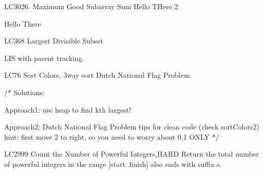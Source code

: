 \begin{problem}{LC3026. Maximum Good Subarray Sum}
    Hello THere 2
\end{problem}

\begin{solution}

    \begin{code3}
        Hello There
    \end{code3}
\end{solution}

\begin{problem}{LC368 Largest Divisible Subset}
\end{problem}

\begin{solution}[Pure LIS (=ending at idx)]

    LIS with parent tracking.
\end{solution}

\begin{problem}{LC76 Sort Colors, 3way sort}
    Dutch National Flag Problem
\end{problem}

\begin{solution}[hints]
    \begin{code2}
    /* Solutions:

    Approach1: use heap to find kth largest!

    Approach2: Dutch National Flag Problem
        tips for clean code (check sortColors2)
        hint: first move 2 to right, so you need to worry about 0,1 ONLY
    */
    \end{code2}
\end{solution}


\begin{problem}{LC2999 Count the Number of Powerful Integers,HARD}
    Return the total number of powerful integers in the range [start..finish] also ends with suffix s.
\end{problem}


